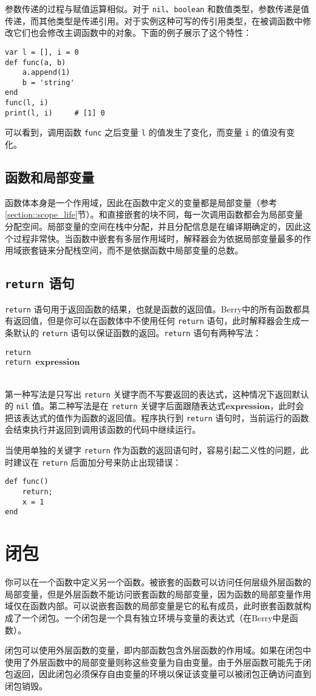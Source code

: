 参数传递的过程与赋值运算相似。对于 \texttt{nil}、\texttt{boolean} 和数值类型，参数传递是值传递，而其他类型是传递引用。对于实例这种可写的传引用类型，在被调函数中修改它们也会修改主调函数中的对象。下面的例子展示了这个特性：
\begin{lstlisting}[language=berry]
var l = [], i = 0
def func(a, b)
    a.append(1)
    b = 'string'
end
func(l, i)
print(l, i)     # [1] 0
\end{lstlisting}
可以看到，调用函数 \texttt{func} 之后变量 \texttt{l} 的值发生了变化，而变量 \texttt{i} 的值没有变化。

\subsection{函数和局部变量}

函数体本身是一个作用域，因此在函数中定义的变量都是局部变量（参考\ref{section::scope_life}节）。和直接嵌套的块不同，每一次调用函数都会为局部变量分配空间。局部变量的空间在栈中分配，并且分配信息是在编译期确定的，因此这个过程非常快。当函数中嵌套有多层作用域时，解释器会为依据局部变量最多的作用域嵌套链来分配栈空间，而不是依据函数中局部变量的总数。

\subsection{\texttt{return} 语句}

\texttt{return} 语句用于返回函数的结果，也就是函数的返回值。Berry中的所有函数都具有返回值，但是你可以在函数体中不使用任何 \texttt{return} 语句，此时解释器会生成一条默认的 \texttt{return} 语句以保证函数的返回。\texttt{return} 语句有两种写法：
\begin{algorithm}
    \texttt{return} \\
    \texttt{return }$\bm{expression}$
\end{algorithm}\vspace{-0.6em}\\
第一种写法是只写出 \texttt{return} 关键字而不写要返回的表达式，这种情况下返回默认的 \texttt{nil} 值。第二种写法是在 \texttt{return} 关键字后面跟随表达式$\bm{expression}$，此时会把该表达式的值作为函数的返回值。程序执行到 \texttt{return} 语句时，当前运行的函数会结束执行并返回到调用该函数的代码中继续运行。

当使用单独的关键字 \texttt{return} 作为函数的返回语句时，容易引起二义性的问题，此时建议在 \texttt{return} 后面加分号来防止出现错误：
\begin{lstlisting}[language=berry, numbers=none]
def func()
    return;
    x = 1
end
\end{lstlisting}

\section{闭包}

你可以在一个函数中定义另一个函数。被嵌套的函数可以访问任何层级外层函数的局部变量，但是外层函数不能访问嵌套函数的局部变量，因为函数的局部变量作用域仅在函数内部。可以说嵌套函数的局部变量是它的私有成员，此时嵌套函数就构成了一个闭包。一个闭包是一个具有独立环境与变量的表达式（在Berry中是函数）。

闭包可以使用外层函数的变量，即内部函数包含外层函数的作用域。如果在闭包中使用了外层函数中的局部变量则称这些变量为自由变量。由于外层函数可能先于闭包返回，因此闭包必须保存自由变量的环境以保证该变量可以被闭包正确访问直到闭包销毁。
